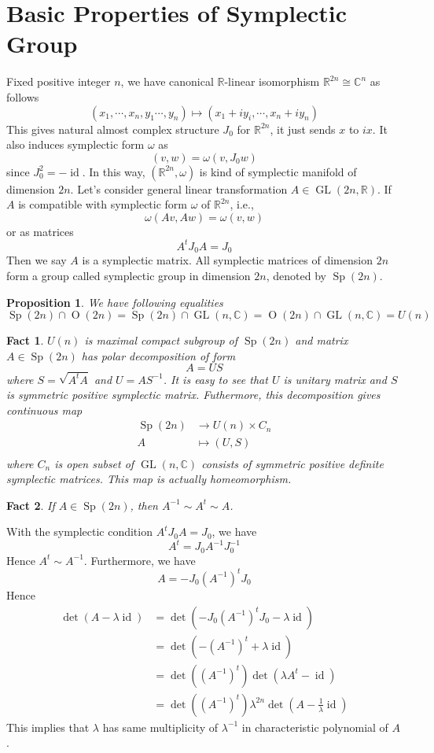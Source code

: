 \documentclass[a4paper,11pt]{amsart}
\DeclareMathOperator{\Sp}{Sp}
\DeclareMathOperator{\id}{id}
\DeclareMathOperator{\gl}{GL}
\DeclareMathOperator{\Orth}{O}
\theoremstyle{plain}
\newtheorem*{fact}{Fact}
\theoremstyle{theorem}
\newtheorem{prop}{Proposition}[subsection]
\theoremstyle{definition}
\begin{document}
\section{Basic Properties of Symplectic Group}
Fixed positive integer $n$, we have canonical $\mathbb{R}$-linear isomorphism $\mathbb{R}^{2n} \cong \mathbb{C}^n$ as follows
\[
(x_1, \cdots, x_n, y_1 \cdots, y_n) \mapsto (x_1 + i y_i, \cdots , x_n + iy_n)
\]
This gives natural almost complex structure $J_0$ for $\mathbb{R}^{2n}$, it just sends $x$ to $ix$. It also induces symplectic form $\omega$ as
\[
(v, w) = \omega(v,J_0 w)
\]
since $J_0^2 = -\id$. In this way, $(\mathbb{R}^{2n},\omega)$ is kind of symplectic manifold of dimension $2n$.
Let's consider general linear transformation $A \in \gl(2n,\mathbb{R})$. If $A$ is compatible with symplectic form $\omega$ of $\mathbb{R}^{2n}$, i.e., 
\[
\omega(A v, Aw) = \omega(v,w)
\]
or as matrices
\[
A^{t}J_0 A = J_0
\]
Then we say $A$ is a symplectic matrix. All symplectic matrices of dimension $2n$ form a group called symplectic group in dimension $2n$, denoted by $\Sp(2n)$.
\begin{prop}
	We have following equalities\[
	\Sp(2n) \cap \Orth(2n) = \Sp(2n) \cap \gl(n,\mathbb{C}) = \Orth(2n) \cap \gl(n,\mathbb{C}) = U(n)
	\]
\end{prop}
\begin{fact}
	$U(n)$ is maximal compact subgroup of $\Sp(2n)$ and matrix $A \in \Sp(2n)$ has polar decomposition of form
	\[
	A = US
	\]
	where $S= \sqrt{A^t A}$ and $U= A S^{-1}$. It is easy to see that $U$ is unitary matrix and $S$ is symmetric positive symplectic matrix. Futhermore, this decomposition gives continuous map
	\[
	\begin{aligned}
	\Sp(2n) & \to U(n) \times C_n\\
	A & \mapsto (U,S)\\
	\end{aligned}
	\]
	where $C_n$ is open subset of $\gl(n,\mathbb{C})$ consists of symmetric positive definite symplectic matrices. This map is actually homeomorphism.
\end{fact}
\begin{fact}
	If $A \in \Sp(2n)$, then $ A^{-1} \sim A^t \sim A$.
\end{fact}
With the symplectic condition $A^t J_0 A = J_0$, we have
\[
A^t = J_0 A^{-1} J_0^{-1}
\]
Hence $A^t \sim A^{-1}$. 
Furthermore, we have 
\[
A = -J_0 (A^{-1})^t J_0
\]
Hence
\[
\begin{aligned}
\det(A-\lambda \id)& = \det(-J_0 (A^{-1})^t J_0 -\lambda \id)\\
& = \det (-(A^{-1})^t + \lambda \id)\\
& = \det((A^{-1})^t) \det(\lambda A^t - \id)\\
& = \det((A^{-1})^t)\lambda^{2n} \det( A - \frac{1}{\lambda} \id)
\end{aligned}
\]
This implies that $\lambda$ has same multiplicity of $\lambda^{-1}$ in characteristic polynomial of $A$.
\end{document}
